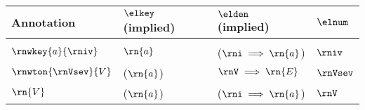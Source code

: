 \begin{tabular}{l|lll}
Annotation & $\elkey$ (implied)       & $\elden$ (implied)       & $\elnum$ \\
\hline \\
$\rnwkey{a}{\rniv}$         & $\rn{a}$              & ($\rni \implies \rn{a}$)       & $\rniv$       \\
$\rnwton{\rnVsev}{V}$       & ($\rn{a}$)            & $\rnV \implies \rn{E}$         & $\rnVsev$       \\
$\rn{V}$                    & ($\rn{a}$)            & ($\rni \implies \rn{a}$)       & $\rnV$    
\end{tabular}
